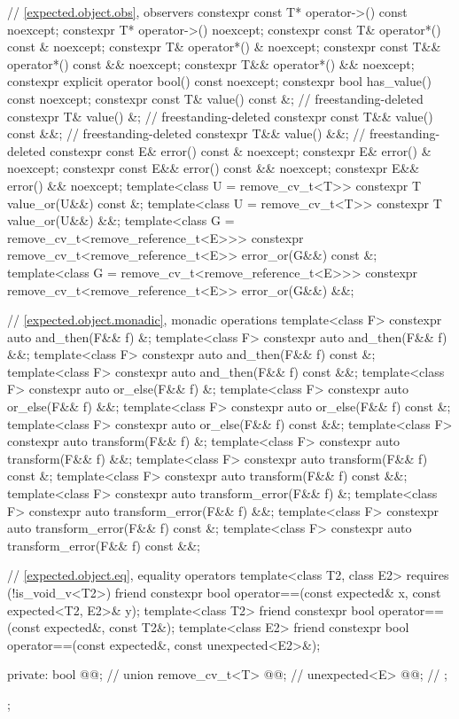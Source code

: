 \begin{codeblock}
{{    // \ref{expected.object.obs}, observers
    constexpr const T* operator->() const noexcept;
    constexpr T* operator->() noexcept;
    constexpr const T& operator*() const & noexcept;
    constexpr T& operator*() & noexcept;
    constexpr const T&& operator*() const && noexcept;
    constexpr T&& operator*() && noexcept;
    constexpr explicit operator bool() const noexcept;
    constexpr bool has_value() const noexcept;
    constexpr const T& value() const &;                                     // freestanding-deleted
    constexpr T& value() &;                                                 // freestanding-deleted
    constexpr const T&& value() const &&;                                   // freestanding-deleted
    constexpr T&& value() &&;                                               // freestanding-deleted
    constexpr const E& error() const & noexcept;
    constexpr E& error() & noexcept;
    constexpr const E&& error() const && noexcept;
    constexpr E&& error() && noexcept;
    template<class U = remove_cv_t<T>> constexpr T value_or(U&&) const &;
    template<class U = remove_cv_t<T>> constexpr T value_or(U&&) &&;
    template<class G = remove_cv_t<remove_reference_t<E>>>
      constexpr remove_cv_t<remove_reference_t<E>> error_or(G&&) const &;
    template<class G = remove_cv_t<remove_reference_t<E>>>
      constexpr remove_cv_t<remove_reference_t<E>> error_or(G&&) &&;

    // \ref{expected.object.monadic}, monadic operations
    template<class F> constexpr auto and_then(F&& f) &;
    template<class F> constexpr auto and_then(F&& f) &&;
    template<class F> constexpr auto and_then(F&& f) const &;
    template<class F> constexpr auto and_then(F&& f) const &&;
    template<class F> constexpr auto or_else(F&& f) &;
    template<class F> constexpr auto or_else(F&& f) &&;
    template<class F> constexpr auto or_else(F&& f) const &;
    template<class F> constexpr auto or_else(F&& f) const &&;
    template<class F> constexpr auto transform(F&& f) &;
    template<class F> constexpr auto transform(F&& f) &&;
    template<class F> constexpr auto transform(F&& f) const &;
    template<class F> constexpr auto transform(F&& f) const &&;
    template<class F> constexpr auto transform_error(F&& f) &;
    template<class F> constexpr auto transform_error(F&& f) &&;
    template<class F> constexpr auto transform_error(F&& f) const &;
    template<class F> constexpr auto transform_error(F&& f) const &&;

    // \ref{expected.object.eq}, equality operators
    template<class T2, class E2> requires (!is_void_v<T2>)
      friend constexpr bool operator==(const expected& x, const expected<T2, E2>& y);
    template<class T2>
      friend constexpr bool operator==(const expected&, const T2&);
    template<class E2>
      friend constexpr bool operator==(const expected&, const unexpected<E2>&);

  private:
    bool @@;           // \expos
    union {
      remove_cv_t<T> @@;   // \expos
      unexpected<E> @@;   // \expos
    };
  };
}
\end{codeblock}


